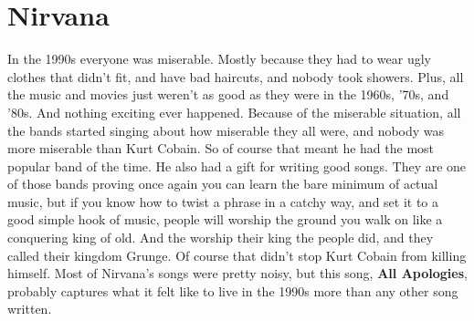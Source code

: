 \documentclass[letterpaper,single]{article}
\begin{document}
\section{Nirvana}
In the 1990s everyone was miserable. 
Mostly because they had to wear ugly clothes that didn't fit, and have bad haircuts, and nobody took showers. 
Plus, all the music and movies just weren't as good as they were in the 1960s, '70s, and '80s. 
And nothing exciting ever happened. 
Because of the miserable situation, all the bands started singing about how miserable they all were, and nobody was more miserable than Kurt Cobain. 
So of course that meant he had the most popular band of the time. 
He also had a gift for writing good songs. 
They are one of those bands proving once again you can learn the bare minimum of actual music, but if you know how to twist a phrase in a catchy way, and set it to a good simple hook of music, people will worship the ground you walk on like a conquering king of old. 
And the worship their king the people did, and they called their kingdom Grunge.
Of course that didn't stop Kurt Cobain from killing himself.
Most of Nirvana's songs were pretty noisy, but this song, \textbf{All Apologies}, probably captures what it felt like to live in the 1990s more than any other song written.
\end{document}
